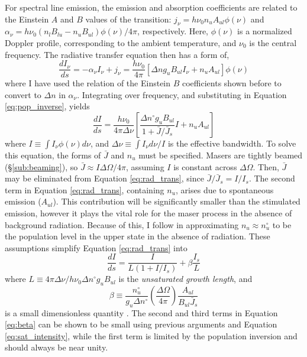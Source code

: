 For spectral line emission, the emission and absorption coefficients are related to the Einstein $A$ and $B$ values of the transition: $j_\nu = h \nu_0 n_u A_{ul}\phi(\nu)$ and $\alpha_\nu = h\nu_0 \left( n_l B_{lu} - n_u B_{ul} \right)\phi(\nu)/4\pi$, respectively. Here, $\phi(\nu)$ is a normalized Doppler profile, corresponding to the ambient temperature, and $\nu_0$ is the central frequency. The radiative transfer equation then has a form of,
\begin{equation}
\label{eq:rad_trans_specific}
\frac{dI_{\nu}}{ds} = -\alpha_{\nu}I_{\nu} + j_{\nu}
    = \frac{h \nu_0}{4\pi} \left[ \Delta n g_u B_{ul} I_{\nu} + n_u A_{ul} \right] \phi(\nu)
\end{equation}
where I have used the relation of the Einstein $B$ coefficients shown before to convert to $\Delta n$ in $\alpha_{\nu}$. Integrating over frequency, and substituting in Equation \ref{eq:pop_inverse}, yields
\begin{equation}
\label{eq:rad_trans}
\frac{dI}{ds} = \frac{h\nu_0}{4\pi \Delta \nu} \left[ \frac{\Delta n^{\circ} g_u B_{ul}}{1 + \bar{J}/\bar{J}_s} I + n_u A_{ul} \right]
\end{equation}
where $I \equiv \int I_{\nu}\phi(\nu)d\nu$, and $\Delta \nu \equiv \int I_{\nu}d\nu/I$ is the effective bandwidth. To solve this equation, the forms of $\bar{J}$ and $n_u$ must be specified. Masers are tightly beamed (\S\ref{sub:beaming}), so $\bar{J} \approx I\Delta\Omega/4\pi$, assuming $I$ is constant across $\Delta\Omega$. Then, $\bar{J}$ may be eliminated from Equation \ref{eq:rad_trans}, since $\bar{J}/\bar{J}_s = I/I_s$. The second term in Equation \ref{eq:rad_trans}, containing $n_u$, arises due to spontaneous emission ($A_{ul}$). This contribution will be significantly smaller than the stimulated emission, however it plays the vital role for the maser process in the absence of background radiation. Because of this, I follow \citet{stahler_palla_2004} in approximating $n_u \approx n_u^{\circ}$ to be the population level in the upper state in the absence of radiation. These assumptions simplify Equation \ref{eq:rad_trans} into
\begin{equation}
\label{eq:final_rad_trans}
\frac{dI}{ds} = \frac{I}{L (1+I/I_s)} + \beta \frac{I_s}{L}
\end{equation}
where $L \equiv 4 \pi \Delta \nu / h \nu_0 \Delta n^{\circ} g_u B_{ul}$ is the {\it unsaturated growth length}, and
\begin{equation}
\label{eq:beta}
\beta \equiv \frac{n_u^{\circ}}{g_u\Delta n^{\circ}} \left( \frac{\Delta\Omega}{4\pi} \right) \frac{A_{ul}}{B_{ul}\bar{J}_s}
\end{equation}
is a small dimensionless quantity \citep{stahler_palla_2004}. The second and third terms in Equation \ref{eq:beta} can be shown to be small using previous arguments and Equation \ref{eq:sat_intensity}, while the first term is limited by the population inversion and should always be near unity.

